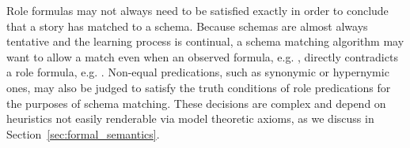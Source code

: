 Role formulas may not always need to be satisfied exactly in order to conclude that a story has matched to a schema.
Because schemas are almost always tentative and the learning process is continual, a schema matching algorithm may want to allow a match even when an observed formula, e.g. , directly contradicts a role formula, e.g. .
Non-equal predications, such as synonymic or hypernymic ones, may also be judged to satisfy the truth conditions of role predications for the purposes of schema matching.
These decisions are complex and depend on heuristics not easily renderable via model theoretic axioms, as we discuss in Section~\ref{sec:formal_semantics}.




